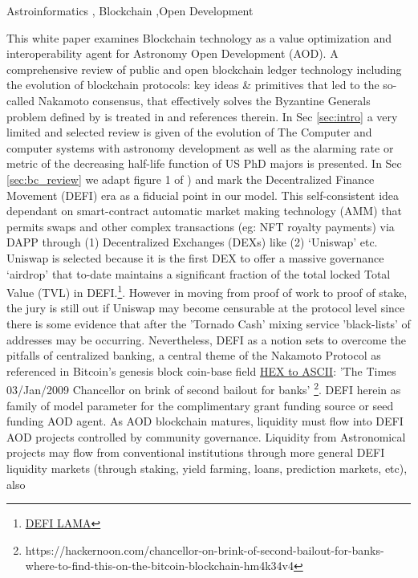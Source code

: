 \documentclass[final,5p,times,twocolumn,authoryear]{elsarticle}
\begin{document}
\begin{frontmatter}



\begin{keyword}
   Astroinformatics \sep 
Blockchain \sep Open Development
\end{keyword}
\end{frontmatter}

This white paper examines Blockchain technology as a value optimization and interoperability agent for Astronomy Open Development (AOD). A comprehensive review of public and open blockchain ledger technology including the evolution of blockchain protocols: key ideas \& primitives that led to the  so-called Nakamoto consensus, that effectively solves the Byzantine Generals problem defined by \cite{Lamport1982TheBG} is treated in  \cite{arvindandclark2017} and references therein. In Sec \ref{sec:intro} a very limited and selected review is given of the evolution of The Computer and computer systems with astronomy development as well as the alarming rate or metric of the decreasing half-life function of US PhD majors \cite{milo_2018} is presented. In Sec \ref{sec:bc_review} we adapt figure 1 of \cite{arvindandclark2017}) and mark the Decentralized Finance Movement (DEFI) era as a fiducial point in our model. This self-consistent idea dependant on smart-contract automatic market making technology (AMM) that permits swaps and other complex transactions (eg: NFT royalty payments) via DAPP through (1) Decentralized Exchanges (DEXs) like (2) `Uniswap' etc. Uniswap is selected because it is the first DEX to offer a massive governance `airdrop' that to-date maintains a significant fraction of the total locked Total Value (TVL) in DEFI.\footnote{\href{https://defillama.com/protocols/dexes}{DEFI LAMA}}. However in moving from proof of work to proof of stake, the jury is still out if Uniswap may become censurable at the protocol level since there is some evidence that after the 'Tornado Cash' mixing service 'black-lists' of addresses may be occurring. Nevertheless, DEFI as a notion sets to overcome the pitfalls of centralized banking, a central theme of the Nakamoto Protocol as referenced in Bitcoin's genesis block \textrm{coin-base field} \href{https://www.blockchain.com/btc/tx/4a5e1e4baab89f3a32518a88c31bc87f618f76673e2cc77ab2127b7afdeda33b}{HEX to ASCII}:  'The Times 03/Jan/2009 Chancellor on brink of second bailout for banks' \footnote{https://hackernoon.com/chancellor-on-brink-of-second-bailout-for-banks-where-to-find-this-on-the-bitcoin-blockchain-hm4k34v4}. DEFI herein as family of model parameter for the complimentary grant funding source or seed funding AOD agent. As AOD blockchain matures, liquidity must flow into DEFI AOD projects controlled by community governance. Liquidity from Astronomical projects may flow from conventional institutions through more general DEFI liquidity markets (through staking, yield farming, loans, prediction markets, etc), also 
\end{document}
